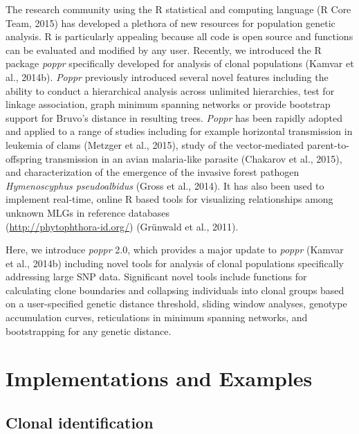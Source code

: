 \documentclass{frontiersSCNS} %
\begin{document}
The research community using the R statistical and computing language (R
Core Team, 2015) has developed a plethora of new resources for
population genetic analysis. R is particularly appealing because all
code is open source and functions can be evaluated and modified by any
user. Recently, we introduced the R package \emph{poppr} specifically
developed for analysis of clonal populations (Kamvar et al., 2014b).
\emph{Poppr} previously introduced several novel features including the
ability to conduct a hierarchical analysis across unlimited hierarchies,
test for linkage association, graph minimum spanning networks or provide
bootstrap support for Bruvo's distance in resulting trees. \emph{Poppr}
has been rapidly adopted and applied to a range of studies including for
example horizontal transmission in leukemia of clams (Metzger et al.,
2015), study of the vector-mediated parent-to-offspring transmission in
an avian malaria-like parasite (Chakarov et al., 2015), and
characterization of the emergence of the invasive forest pathogen
\emph{Hymenoscyphus pseudoalbidus} (Gross et al., 2014). It has also
been used to implement real-time, online R based tools for visualizing
relationships among unknown MLGs in reference
databases\\(\url{http://phytophthora-id.org/}) (Gr{\"{u}}nwald et al.,
2011).

Here, we introduce \emph{poppr} 2.0, which provides a major update to
\emph{poppr} (Kamvar et al., 2014b) including novel tools for analysis
of clonal populations specifically addressing large SNP data.
Significant novel tools include functions for calculating clone
boundaries and collapsing individuals into clonal groups based on a
user-specified genetic distance threshold, sliding window analyses,
genotype accumulation curves, reticulations in minimum spanning
networks, and bootstrapping for any genetic distance.

\section*{Implementations and
Examples}\label{implementations-and-examples}

\subsection*{Clonal identification}\label{clonal-identification}
\end{document}
